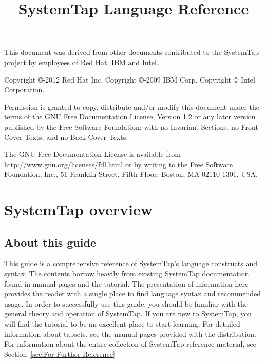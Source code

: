 \documentclass[twoside,english]{article}
\begin{document}
\title{SystemTap Language Reference}

\maketitle
\newpage{}
This document was derived from other documents contributed to the SystemTap project by employees of Red Hat, IBM and Intel.\newline

Copyright \copyright{}-2012 Red Hat Inc.\newline
Copyright \copyright{}-2009 IBM Corp.\newline
Copyright \copyright{} Intel Corporation.\newline

Permission is granted to copy, distribute and/or modify this document
under the terms of the GNU Free Documentation License, Version 1.2
or any later version published by the Free Software Foundation;
with no Invariant Sections, no Front-Cover Texts, and no Back-Cover Texts.\newline

The GNU Free Documentation License is available from
\url{http://www.gnu.org/licenses/fdl.html} or by writing to
the Free Software Foundation, Inc., 51 Franklin Street,
Fifth Floor, Boston, MA 02110-1301, USA.
\newpage{}
\tableofcontents{}
\newpage{}

\section{SystemTap overview\label{sec:SystemTap-Overview}}

\subsection{About this guide}

This guide is a comprehensive reference of SystemTap's language constructs
and syntax. The contents borrow heavily from existing SystemTap documentation
found in manual pages and the tutorial. The presentation of information here
provides the reader with a single place to find language syntax and recommended
usage. In order to successfully use this guide, you should be familiar with
the general theory and operation of SystemTap. If you are new to SystemTap,
you will find the tutorial to be an excellent place to start learning. For
detailed information about tapsets, see the manual pages provided with the
distribution. For information about the entire collection of SystemTap reference
material, see Section~\ref{sec:For-Further-Reference}
\end{document}
